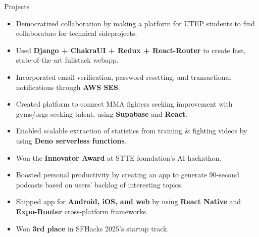 \documentclass{resume} %
\begin{document}
\begin{workSection}{Projects}
	
	\customItem[
	title=\href{https://github.com/AshkanArabim/hackerhunt}{hackerhunt.tech \faExternalLink},
	duration=Solo | January 2025 - present,
	]
	\begin{itemize}
		\vspace{-0.5em}
		\itemsep -6pt {}
		\item Democratized collaboration by making a platform for UTEP students to find collaborators for technical sideprojects. 
		\item Used \textbf{Django + ChakraUI + Redux + React-Router} to create fast, state-of-the-art fullstack webapp.
		\item Incorporated email verification, password resetting, and transactional notifications through \textbf{AWS SES}.
	\end{itemize}
	
	\customItem[
	title=Athlytix,
	duration=Team of 4 | April 2025 - May 2025,
	]
	\begin{itemize}
		\vspace{-0.5em}
		\itemsep -6pt {}
		\item Created platform to connect MMA fighters seeking improvement with gyms/orgs seeking talent, using \textbf{Supabase} and \textbf{React}.
		\item Enabled scalable extraction of statistics from training \& fighting videos by using \textbf{Deno serverless functions}.
		\item Won the \textbf{Innovator Award} at STTE foundation's AI hackathon.
	\end{itemize}

	\customItem[
	title=\href{https://github.com/chesterCaii/back-logz/}{Backlogz \faExternalLink}, %
	duration=Team of 4 | April 2025,
	]
	\begin{itemize}
		\vspace{-0.5em}
		\itemsep -6pt {}
		\item Boosted personal productivity by creating an app to generate 90-second podcasts based on users' backlog of interesting topics.
		\item Shipped app for \textbf{Android, iOS, and web} by using \textbf{React Native} and \textbf{Expo-Router} cross-platform frameworks.
		\item Won \textbf{3rd place} in SFHacks 2025's startup track.
	\end{itemize}
	

\end{workSection}
\end{document}
